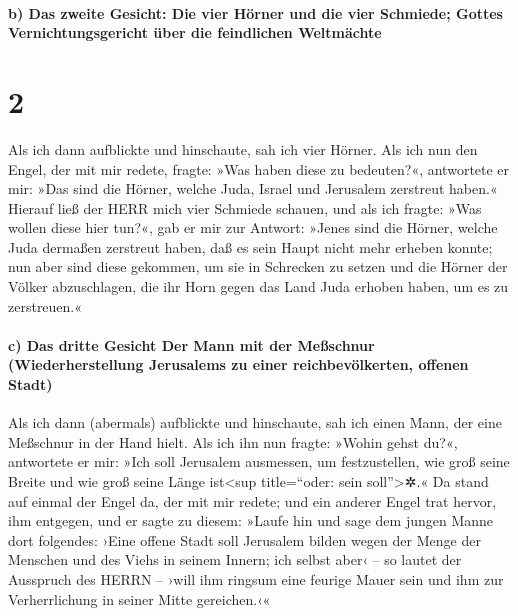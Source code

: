 \hypertarget{b-das-zweite-gesicht-die-vier-huxf6rner-und-die-vier-schmiede-gottes-vernichtungsgericht-uxfcber-die-feindlichen-weltmuxe4chte}{%
\paragraph{b) Das zweite Gesicht: Die vier Hörner und die vier Schmiede;
Gottes Vernichtungsgericht über die feindlichen
Weltmächte}\label{b-das-zweite-gesicht-die-vier-huxf6rner-und-die-vier-schmiede-gottes-vernichtungsgericht-uxfcber-die-feindlichen-weltmuxe4chte}}

\hypertarget{section-1}{%
\section{2}\label{section-1}}

 Als ich dann aufblickte und hinschaute, sah ich vier
Hörner.  Als ich nun den Engel, der mit mir redete,
fragte: »Was haben diese zu bedeuten?«, antwortete er mir: »Das sind die
Hörner, welche Juda, Israel und Jerusalem zerstreut haben.«
 Hierauf ließ der HERR mich vier Schmiede schauen,
 und als ich fragte: »Was wollen diese hier tun?«, gab er
mir zur Antwort: »Jenes sind die Hörner, welche Juda dermaßen zerstreut
haben, daß es sein Haupt nicht mehr erheben konnte; nun aber sind diese
gekommen, um sie in Schrecken zu setzen und die Hörner der Völker
abzuschlagen, die ihr Horn gegen das Land Juda erhoben haben, um es zu
zerstreuen.«

\hypertarget{c-das-dritte-gesicht-der-mann-mit-der-meuxdfschnur-wiederherstellung-jerusalems-zu-einer-reichbevuxf6lkerten-offenen-stadt}{%
\paragraph{c) Das dritte Gesicht Der Mann mit der Meßschnur
(Wiederherstellung Jerusalems zu einer reichbevölkerten, offenen
Stadt)}\label{c-das-dritte-gesicht-der-mann-mit-der-meuxdfschnur-wiederherstellung-jerusalems-zu-einer-reichbevuxf6lkerten-offenen-stadt}}

 Als ich dann (abermals) aufblickte und hinschaute, sah
ich einen Mann, der eine Meßschnur in der Hand hielt.  Als
ich ihn nun fragte: »Wohin gehst du?«, antwortete er mir: »Ich soll
Jerusalem ausmessen, um festzustellen, wie groß seine Breite und wie
groß seine Länge ist\textless sup title=``oder: sein
soll''\textgreater✲.«  Da stand auf einmal der Engel da,
der mit mir redete; und ein anderer Engel trat hervor, ihm entgegen,
 und er sagte zu diesem: »Laufe hin und sage dem jungen
Manne dort folgendes: ›Eine offene Stadt soll Jerusalem bilden wegen der
Menge der Menschen und des Viehs in seinem Innern;  ich
selbst aber‹ -- so lautet der Ausspruch des HERRN -- ›will ihm ringsum
eine feurige Mauer sein und ihm zur Verherrlichung in seiner Mitte
gereichen.‹«

